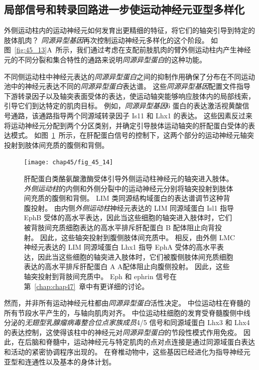 \subsection{局部信号和转录回路进一步使运动神经元亚型多样化}

外侧运动柱内的运动神经元如何发育出更精细的特征，将它们的轴突引导到特定的肢体肌肉？
\textit{同源异型基因}再次控制运动神经元多样化的这个阶段。
如图~\ref{fig:45_13}A~所示，我们通过考虑在支配前肢肌肉的臂外侧运动柱内产生神经元的不同分裂和集合特性的通路来说明\textit{同源异型蛋白}的这种功能。


不同侧运动柱中神经元表达的\textit{同源异型蛋白}之间的抑制作用确保了分布在不同运动池中的神经元表达不同的\textit{同源异型蛋白}表达谱。
这些\textit{同源异型基因}配置文件指导下游转录因子以及轴突表面受体的表达，使运动轴突能够响应肢体内的局部线索，引导它们到达特定的肌肉目标。
例如，\textit{同源异型基因}6 蛋白的表达激活视黄酸信号通路，该通路指导两个同源域转录因子 Is11 和 Lhx1 的表达。
这些因素反过来将运动神经元分配到两个分区类别，并确定引导肢体运动轴突的肝配蛋白受体的表达模式。
如图~\ref{fig:45_14}~所示，在肝配蛋白信号的控制下，这两个部分的运动神经元轴突投射到肢体间充质的腹侧和背侧。


\begin{figure}[htbp]
	\centering
	\texttt{[image: chap45/fig\_45\_14]}
	\caption{肝配蛋白类酪氨酸激酶受体引导外侧运动柱神经元的轴突进入肢体。
		\textit{外侧运动柱}的内侧和外侧分裂中的运动神经元分别将轴突投射到肢体间充质的腹侧和背侧。
		LIM 类同源结构域蛋白的表达谱调节这种背腹投射。 
		由内侧\textit{外侧运动柱}神经元表达的 LIM 同源域蛋白 Isl1 指导 EphB 受体的高水平表达，因此当这些细胞的轴突进入肢体时，它们被背肢间充质细胞表达的高水平排斥肝配蛋白 B 配体阻止向背投射。
		因此，这些轴突投射到腹侧肢体间充质中。
		相反，由外侧 LMC 神经元表达的 LIM 同源域蛋白 Lhx1 指导 EphA 受体的高水平表达，因此当这些细胞的轴突进入肢体时，它们被腹侧肢体间充质细胞表达的高水平排斥肝配蛋白 A A配体阻止向腹侧投射。
		因此，这些轴突投射到背肢间充质中。
		Eph 和 ephrin 信号在第~\ref{chap:chap47}~章中有更详细的讨论。}
	\label{fig:45_14}
\end{figure}


然而，并非所有运动神经元柱都由\textit{同源异型蛋白}活性决定。
中位运动柱在脊髓的所有节段水平产生的，与轴向肌肉对齐。
中位运动柱细胞的发育受脊髓腹侧中线分泌的\textit{无翅型乳腺瘤病毒整合位点家族成员}4/5 信号和同源域蛋白 Lhx3 和 Lhx4 的表达控制，这使得该柱中的神经元对\textit{同源异型蛋白}的节段性模式作用免疫。
因此，在后脑和脊髓中，运动神经元与特定肌肉的点对点连接是通过同源域蛋白表达和活动的紧密协调程序出现的。
在脊椎动物中，这些基因已经进化为指导神经元亚型和连通性以及基本的身体计划。



